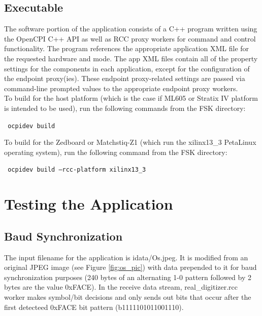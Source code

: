 \subsection{Executable}
The software portion of the application consists of a C++ program written using the OpenCPI C++ API as well as RCC proxy workers for command and control functionality. The program references the appropriate application XML file for the requested hardware and mode. The app XML files contain all of the property settings for the components in each application, except for the configuration of the endpoint proxy(ies). These endpoint proxy-related settings are passed via command-line prompted values to the appropriate endpoint proxy workers.\\
To build for the host platform (which is the case if ML605 or Stratix IV platform is intended to be used), run the following commands from the FSK directory:\par\medskip
\texttt{ ocpidev build}\par\medskip
\noindent To build for the Zedboard or Matchstiq-Z1 (which run the xilinx13\_3 PetaLinux operating system), run the following command from the FSK directory:\par\medskip 
\texttt{ ocpidev build --rcc-platform xilinx13\_3 }\par\medskip

\section{Testing the Application}
\subsection{Baud Synchronization}
The input filename for the application is idata/Os.jpeg. It is modified from an original JPEG image (see Figure \ref{fig:os_pic}) with data prepended to it for baud synchronization purposes (240 bytes of an alternating 1-0 pattern followed by 2 bytes are the value 0xFACE). In the receive data stream, real\_digitizer.rcc worker makes symbol/bit decisions and only sends out bits that occur after the first detecteed 0xFACE bit pattern (b1111101011001110).

